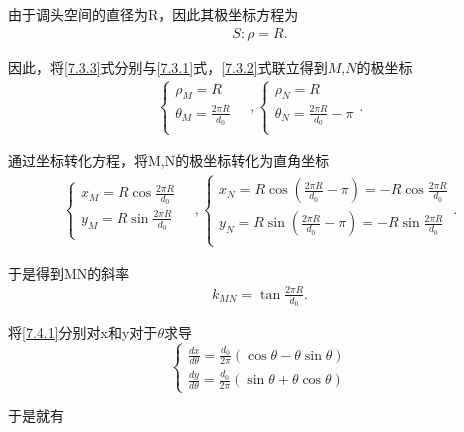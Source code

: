 \documentclass{cumcmthesis}
\begin{document}
    \par 由于调头空间的直径为R，因此其极坐标方程为
    \begin{align}
        S:\rho =R. \label{7.3.3} 
    \end{align}
    \par 因此，将\eqref{7.3.3}式分别与\eqref{7.3.1}式，\eqref{7.3.2}式联立得到$M$,$N$的极坐标
    \begin{gather}\label{1.........40}
        \begin{cases}
        \rho _M=R\\
        \theta _M=\frac{2\pi R}{d_0}\\
        \end{cases}
        \quad,
        \begin{cases}
        \rho _N=R\\
        \theta _N=\frac{2\pi R}{d_0}-\pi \\
        \end{cases}.
        \end{gather}
   \par 通过坐标转化方程，将M,N的极坐标转化为直角坐标
   \begin{gather}\label{1.........42}
    \begin{cases}
        x_M = R\cos\frac{2\pi R}{d_0}\\
        y_M = R\sin\frac{2\pi R}{d_0}\\
    \end{cases}
    \quad,
    \begin{cases}
        x_N = R\cos(\frac{2\pi R}{d_0}-\pi)= - R\cos\frac{2\pi R}{d_0}\\
        y_N = R\sin(\frac{2\pi R}{d_0}-\pi)= - R\sin\frac{2\pi R}{d_0}
         \\
    \end{cases}.
    \end{gather}
    \par 于是得到MN的斜率
    \begin{align}
        k_{MN}=\tan\frac{2\pi R}{d_0}.\label{7.3.4}
        \end{align}
    \par 将\eqref{7.4.1}分别对x和y对于$\theta $求导
    \[
\begin{cases}\label{1.........44}
\frac{dx}{d\theta} = \frac{d_0}{2\pi} (\cos\theta - \theta\sin\theta) \\
\frac{dy}{d\theta} = \frac{d_0}{2\pi} (\sin\theta + \theta\cos\theta)
\end{cases}
\]
\par 于是就有
\end{document}
